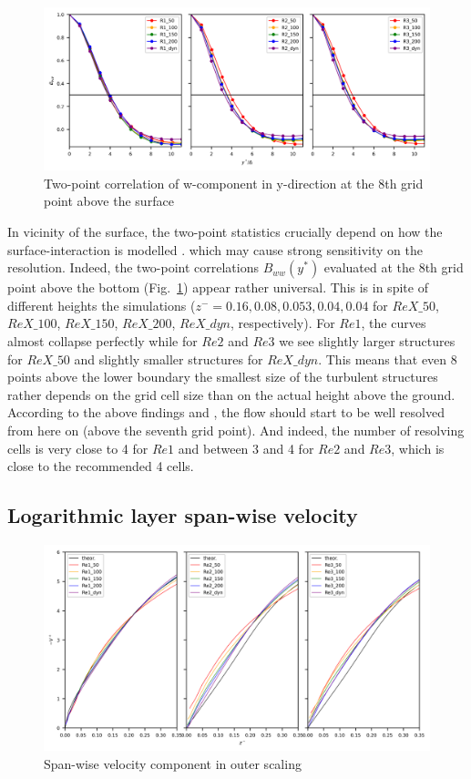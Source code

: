 \documentclass[a4paper,11pt]{article}
\begin{document}
\begin{figure}[ht]
  \centerline{\includegraphics[width=\textwidth]{figures_2024/d3y_2pc_ww_3Re_4.png}}
  \caption{Two-point correlation of w-component in y-direction at the 8th grid point above the surface}
  \label{fig:2pc_4}
\end{figure}

In vicinity of the surface, the two-point statistics crucially depend on how the surface-interaction is modelled \citep{maronga2014monin}. which may cause strong sensitivity on the resolution. Indeed, the two-point correlations $B_{ww}(y^*)$ evaluated at the 8th grid point above the bottom (Fig.~\ref{fig:2pc_4}) appear rather universal. This is in spite of different heights the simulations ($z^-=0.16, 0.08, 0.053, 0.04, 0.04$ for $ReX\_50$, $ReX\_100$, $ReX\_150$, $ReX\_200$, $ReX\_dyn$, respectively). For $Re1$, the curves almost collapse perfectly while for $Re2$ and $Re3$ we see slightly larger structures for $ReX\_50$ and slightly smaller structures for $ReX\_dyn$. This means that even 8 points above the lower boundary the smallest size of the turbulent structures rather depends on the grid cell size than on the actual height above the ground. According to the above findings and \cite{maronga2014monin}, the flow should start to be well resolved from here on (above the seventh grid point). And indeed, the number of resolving cells is very close to 4 for $Re1$ and between 3 and 4 for $Re2$ and $Re3$, which is close to the recommended 4 cells.

%
\subsection{Logarithmic layer span-wise velocity}

\begin{figure}[ht]
  \centerline{\includegraphics[width=\textwidth]{figures_2024/d3y_3Re_v_outer_lin.png}}
  \caption{Span-wise velocity component in outer scaling}
  \label{fig:3Re_v_lin}
\end{figure}
\end{document}

